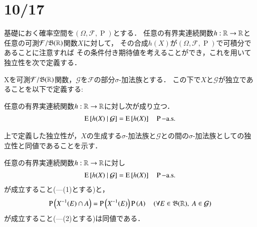 \section{10/17}
	基礎におく確率空間を$(\Omega,\mathcal{F},\operatorname{P})$とする．
	任意の有界実連続関数$h:\mathbb{R} \rightarrow \mathbb{R}$と任意の可測$\mathcal{F}/\mathfrak{B}(\mathbb{R})$関数$X$に対して，
	その合成$h(X)$が$(\Omega,\mathcal{F},\operatorname{P})$で可積分であることに注意すれば
	その条件付き期待値を考えることができ，これを用いて独立性を次で定義する．
	
	\begin{dfn}[独立性]
		Xを可測$\mathcal{F}/\mathfrak{B}(\mathbb{R})$関数，$\mathcal{G}$を$\mathcal{F}$の部分$\sigma$-加法族とする．
		この下で$X$と$\mathcal{G}$が独立であることを以下で定義する:
		
		任意の有界実連続関数$h:\mathbb{R} \rightarrow \mathbb{R}$に対し次が成り立つ．
		\begin{align}
			\operatorname{E} \left[ h(X) \ \middle|\ \mathcal{G} \right] = \operatorname{E} \left[ h(X) \right] \quad \operatorname{P}\mathrm{-a.s.}
		\end{align}
	\end{dfn}
	
	上で定義した独立性が，$X$の生成する$\sigma$-加法族と$\mathcal{G}$との間の$\sigma$-加法族としての独立性と同値であることを示す．
	
	\begin{prp}[独立性の同値条件]
		任意の有界実連続関数$h:\mathbb{R} \rightarrow \mathbb{R}$に対し
		\begin{align}
			\operatorname{E} \left[ h(X) \ \middle|\ \mathcal{G} \right] = \operatorname{E} \left[ h(X) \right] \quad \operatorname{P}\mathrm{-a.s.}
		\end{align}
		が成立すること(---(1)とする)と，
		\begin{align}
			\operatorname{P} \left(X^{-1}(E) \cap A\right) = \operatorname{P} \left(X^{-1}(E)\right)\operatorname{P} \left(A\right) \quad (\forall E \in \mathfrak{B}(\mathbb{R}),\ A \in \mathcal{G})
		\end{align}
		が成立すること(---(2)とする)は同値である．
	\end{prp}
	
